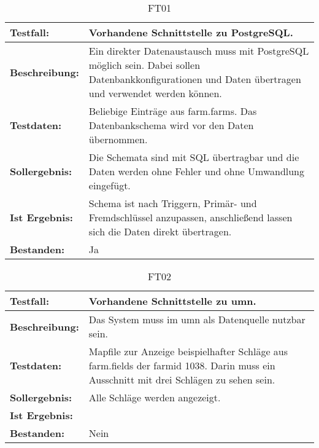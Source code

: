 \label{appendix:funktionstests} 
\capstartfalse
\begin{table}[h!]
\centering
\small
\begin{tabular}{p{2.8cm}|p{12cm}}
\textbf{Testfall:} & Vorhandene Schnittstelle zu PostgreSQL. \\ \hline
\textbf{Beschreibung:} & Ein direkter Datenaustausch muss mit PostgreSQL möglich sein. Dabei sollen Datenbankkonfigurationen und Daten übertragen und verwendet werden können. \\ \hline
\textbf{Testdaten:} & Beliebige Einträge aus farm.farms. Das Datenbankschema wird vor den Daten übernommen. \\ \hline
\textbf{Sollergebnis:} & Die Schemata sind mit SQL übertragbar und die Daten werden ohne Fehler und ohne Umwandlung eingefügt. \\ \hline
\textbf{Ist Ergebnis:} & Schema ist nach Triggern, Primär- und Fremdschlüssel anzupassen, anschließend lassen sich die Daten direkt übertragen. \\ \hline
\textbf{Bestanden:} & Ja \\
\end{tabular}
\caption*{FT01}
\end{table}

\begin{table}[h!]
\centering
\small
\begin{tabular}{p{2.8cm}|p{12cm}}
\textbf{Testfall:} & Vorhandene Schnittstelle zu \Gls{umn}. \\ \hline
\textbf{Beschreibung:} & Das System muss im \Gls{umn} als Datenquelle nutzbar sein. \\ \hline
\textbf{Testdaten:} & Mapfile zur Anzeige beispielhafter Schläge aus farm.fields der farmid 1038. Darin muss ein Ausschnitt mit drei Schlägen zu sehen sein. \\ \hline
\textbf{Sollergebnis:} & Alle Schläge werden angezeigt. \\ \hline
\textbf{Ist Ergebnis:} &  \\ \hline %
\textbf{Bestanden:} & Nein \\
\end{tabular}
\caption*{FT02}
\end{table}

